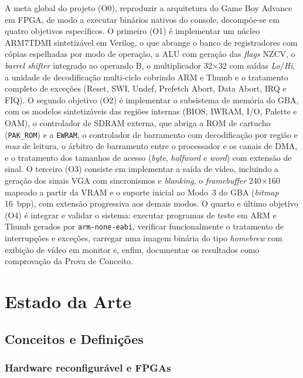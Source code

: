 \documentclass[pnumromarab,times]{politex}
\begin{document}
A meta global do projeto (O0), reproduzir a arquitetura do Game Boy
Advance em FPGA, de modo a executar binários nativos do console,
decompõe-se em quatro objetivos específicos. O primeiro (O1) é
implementar um núcleo ARM7TDMI sintetizável em Verilog, o que abrange
o banco de registradores com cópias espelhadas por modo de operação,
a ALU com geração das \textit{flags} NZCV, o \textit{barrel shifter}
integrado ao operando B, o multiplicador 32$\times$32 com saídas
\textit{Lo}/\textit{Hi}, a unidade de decodificação multi-ciclo
cobrindo ARM e Thumb e o tratamento completo de exceções (Reset, SWI,
Undef, Prefetch Abort, Data Abort, IRQ e FIQ). O segundo objetivo (O2)
é implementar o subsistema de memória do GBA, com os modelos
sintetizáveis das regiões internas (BIOS, IWRAM, I/O, Palette e
OAM), o controlador de SDRAM externa, que abriga a ROM de cartucho
(\texttt{PAK\_ROM}) e a \texttt{EWRAM}, o controlador de barramento com decodificação por
região e \textit{mux} de leitura, o árbitro de barramento entre o
processador e os canais de DMA, e o tratamento dos tamanhos de acesso
(\textit{byte}, \textit{halfword} e \textit{word}) com extensão de
sinal. O terceiro (O3) consiste em
implementar a saída de vídeo, incluindo a geração dos sinais VGA com
sincronismos e \textit{blanking}, o \textit{framebuffer} 240$\times$160
mapeado a partir da VRAM e o suporte inicial ao Modo~3 do GBA
(\textit{bitmap} 16~bpp), com extensão progressiva aos demais modos.
O quarto e último objetivo (O4) é integrar e validar o sistema:
executar programas de teste em ARM e Thumb gerados por
\texttt{arm-none-eabi}, verificar funcionalmente o tratamento de
interrupções e exceções, carregar uma imagem binária do tipo
\textit{homebrew} com exibição de vídeo em monitor e, enfim, documentar
os resultados como comprovação da Prova de Conceito.


\chapter{Estado da Arte}
\label{cap:estado-arte}

\section{Conceitos e Definições}
\label{sec:conceitos}

\subsection{Hardware reconfigurável e FPGAs}
\end{document}
